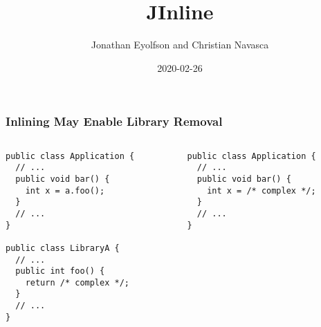 \documentclass[aspectratio=169]{beamer}
\title{JInline}
\author{Jonathan Eyolfson and Christian Navasca}
\date{2020-02-26}
\begin{document}
  \begin{frame}[plain]
    \titlepage
  \end{frame}

  \setcounter{framenumber}{0}

  \begin{frame}[fragile]
    \frametitle{Inlining May Enable Library Removal}

    \begin{columns}[t]
      \begin{column}{0.5\textwidth}
        \hspace{3.4em} 
        \begin{lstlisting}[xleftmargin=4em]
public class Application {
  // ...
  public void bar() {
    int x = a.foo();
  }
  // ...
}

public class LibraryA {
  // ...
  public int foo() {
    return /* complex */;
  }
  // ...
}
        \end{lstlisting}
      \end{column}
      \begin{column}{0.5\textwidth}
        \hspace{3.4em} 
        \begin{lstlisting}[xleftmargin=4em]
public class Application {
  // ...
  public void bar() {
    int x = /* complex */;
  }
  // ...
}
        \end{lstlisting}
      \end{column}
    \end{columns}
  \end{frame}
\end{document}
